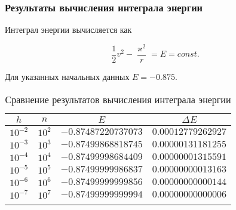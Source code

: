 \begin{frame}
\frametitle{Результаты вычисления интеграла энергии}

Интеграл энергии вычисляется как

\su
\begin{equation}
  \frac{1}{2} v^2 - \frac{\varkappa^2}{r} = E = const.
\end{equation}

Для указанных начальных данных $ E = -0.875 $.

\begin{table}[h]
  \centering
  \caption{Сравнение результатов вычисления интеграла энергии}
  \begin{tabular}{cccc}
    \toprule
    $ h $ &
    $ n $ &
    $ E $ &
    $ \Delta E $ \\
    \midrule
    $ 10^{-2} $ & $ 10^2 $ & $ -0.87487220737073 $ & $ 0.00012779262927 $ \\
    \arrayrulecolor{black!40}
    \midrule
    $ 10^{-3} $ & $ 10^3 $ & $ -0.87499868818745 $ & $ 0.00000131181255 $ \\
    \midrule
    $ 10^{-4} $ & $ 10^4 $ & $ -0.87499998684409 $ & $ 0.00000001315591 $ \\
    \midrule
    $ 10^{-5} $ & $ 10^5 $ & $ -0.87499999986837 $ & $ 0.00000000013163 $ \\
    \midrule
    $ 10^{-6} $ & $ 10^6 $ & $ -0.87499999999856 $ & $ 0.00000000000144 $ \\
    \midrule
    $ 10^{-7} $ & $ 10^7 $ & $ -0.87499999999994 $ & $ 0.00000000000006 $ \\
    \arrayrulecolor{black}
    \bottomrule
  \end{tabular}
\end{table}

\end{frame}

